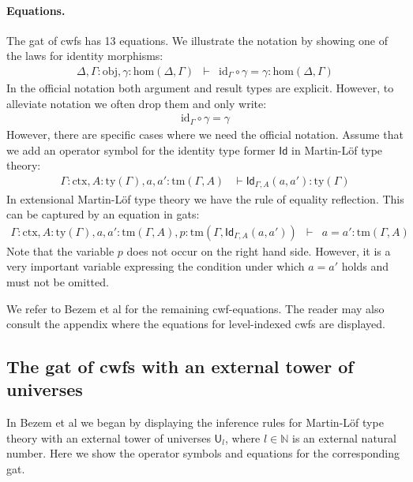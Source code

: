 \documentclass[11pt,a4paper]{article}
\theoremstyle{plain}
\theoremstyle{definition}
\newcommand{\Id}{\mathsf{Id}}
\newcommand{\id}{\mathsf{id}}
\newcommand{\UU}{\mathsf{U}}
\def\Nbb{\mathbb{N}}
\def\UU{\mathsf{U}}
\def\Obj{\mathrm{obj}}
\def\sub{\mathrm{hom}}
\def\id{\mathrm{id}}
\newcommand{\ctx}{\mathrm{ctx}}
\newcommand{\ty}{\mathrm{ty}}
\newcommand{\tm}{\mathrm{tm}}
\begin{document}
\paragraph{Equations.}
The gat of cwfs has 13 equations. We illustrate the notation by showing one of the laws for identity morphisms:\begin{eqnarray*}
\Delta, \Gamma : \Obj, \gamma : \sub(\Delta,\Gamma) &\vdash& \id_\Gamma \circ \gamma = \gamma : \sub(\Delta,\Gamma)
\end{eqnarray*}
In the official notation both argument and result types are explicit. However, to alleviate notation we often drop them and only write:
\begin{eqnarray*}
\id_\Gamma \circ \gamma = \gamma
\end{eqnarray*}
However, there are specific cases where we need the official notation. Assume that we add an operator symbol for the identity type former $\Id$ in Martin-Löf type theory:
\begin{eqnarray*}
\Gamma : \ctx, A : \ty(\Gamma), a, a' : \tm(\Gamma, A) &\vdash \Id_{\Gamma,A}(a,a'): \ty(\Gamma)
\end{eqnarray*}
In extensional Martin-Löf type theory \cite{martinlof:hannover} we have the rule of equality reflection. This can be captured by an equation in gats:
\begin{eqnarray*}
\Gamma : \ctx, A : \ty(\Gamma), a, a' : \tm(\Gamma, A),p :  \tm(\Gamma,\Id_{\Gamma,A}(a,a'))&\vdash& a = a' : \tm(\Gamma,A)
\end{eqnarray*}
Note that the variable $p$ does not occur on the right hand side.
However, it is a very important variable expressing
the condition under which $a=a'$ holds and must not be omitted.

We refer to Bezem et al \cite{bezem:hofmann} for the remaining cwf-equations. The reader may also consult the appendix where the equations for level-indexed cwfs are displayed.


\subsection{The gat of cwfs with an external tower of universes}
In Bezem et al \cite{BezemCDE22} we began by displaying the inference rules for Martin-Löf type theory with an external tower of universes $\UU_l$, where $l \in \Nbb$ is an external natural number. Here we show the operator symbols and equations for the corresponding gat.
\end{document}
